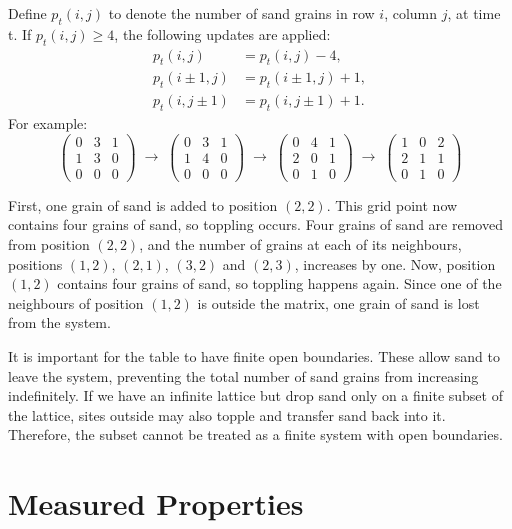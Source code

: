 Define $p_t(i,j)$ to denote the number of sand grains in row $i$, column $j$, at time t. If $p_t(i,j) \ge 4$, the following updates are applied:
\[
\begin{aligned}
p_t(i,j) &= p_t(i,j)-4,\\
p_t(i\pm1,j) &= p_t(i\pm1,j)+1,\\
p_t(i,j\pm1) &= p_t(i,j\pm1)+1.
\end{aligned}
\]
For example:
\[
\begin{pmatrix}
0 & 3 & 1 \\
1 & 3 & 0 \\
0 & 0 & 0
\end{pmatrix}
\;\rightarrow\;
\begin{pmatrix}
0 & 3 & 1 \\
1 & 4 & 0 \\
0 & 0 & 0
\end{pmatrix}
\;\rightarrow\;
\begin{pmatrix}
0 & 4 & 1 \\
2 & 0 & 1 \\
0 & 1 & 0
\end{pmatrix}
\;\rightarrow\;
\begin{pmatrix}
1 & 0 & 2 \\
2 & 1 & 1 \\
0 & 1 & 0
\end{pmatrix}
\]

First, one grain of sand is added to position $(2,2)$. This grid point now contains four grains of sand, so toppling occurs. Four grains of sand are removed from position $(2,2)$, and the number of grains at each of its neighbours, positions $(1,2)$, $(2,1)$, $(3,2)$ and $(2,3)$, increases by one. Now, position $(1,2)$ contains four grains of sand, so toppling happens again. Since one of the neighbours of position $(1,2)$ is outside the matrix, one grain of sand is lost from the system.

\newpage

It is important for the table to have finite open boundaries. These allow sand to leave the system, preventing the total number of sand grains from increasing indefinitely. If we have an infinite lattice but drop sand only on a finite subset of the lattice, sites outside may also topple and transfer sand back into it. Therefore, the subset cannot be treated as a finite system with open boundaries.

\section{Measured Properties}

